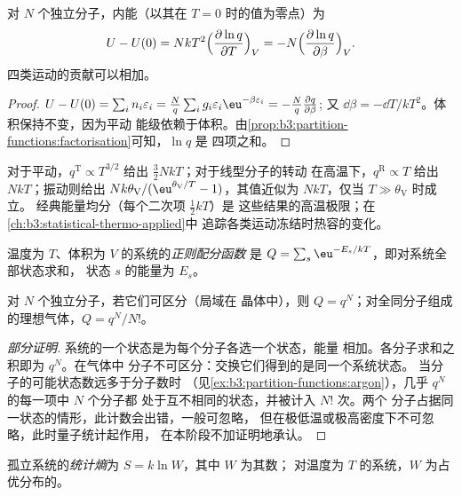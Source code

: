 \begin{theorem}[内能]\label{thm:b3:partition-functions:internal-energy}
对 $N$ 个独立分子，内能（以其在
$T = 0$ 时的值为零点）为
\[
  U - U(0) = NkT^2\Bigl(\frac{\partial\ln q}{\partial T}\Bigr)_V
          = -N\Bigl(\frac{\partial\ln q}{\partial\beta}\Bigr)_V .
\]
四类运动的贡献可以相加。
\end{theorem}

\begin{proof}
$U - U(0) = \sum_in_i\varepsilon_i = \frac Nq\sum_ig_i\varepsilon_i\eu^{-\beta\varepsilon_i} = -\frac Nq\frac{\partial q}{\partial\beta}$;
又 $\dd\beta = -\dd T/kT^2$。体积保持不变，因为平动
能级依赖于体积。由\cref{prop:b3:partition-functions:factorisation}可知，$\ln q$ 是
四项之和。
\end{proof}

对于平动，$q^{\mathrm T} \propto T^{3/2}$ 给出 $\frac32NkT$；对于线型分子的转动
在高温下，$q^{\mathrm R} \propto T$ 给出 $NkT$；振动则给出
$Nk\theta_{\mathrm V}/(\eu^{\theta_{\mathrm V}/T} - 1)$，其值近似为 $NkT$，仅当 $T \gg \theta_{\mathrm V}$ 时成立。
经典能量均分（每个二次项 $\frac12kT$）是
这些结果的高温极限；在\cref{ch:b3:statistical-thermo-applied}中
追踪各类运动冻结时热容的变化。

\begin{definition}[正则配分函数]\label{def:b3:partition-functions:canonical}
温度为 $T$、体积为 $V$ 的系统的\emph{正则配分函数}
是 $Q = \sum_s\eu^{-E_s/kT}$，即对系统全部状态求和，
状态 $s$ 的能量为 $E_s$。
\end{definition}

\begin{proposition}[理想气体的正则配分函数]\label{prop:b3:partition-functions:canonical}
对 $N$ 个独立分子，若它们可区分（局域在
晶体中），则 $Q = q^N$；对全同分子组成的理想气体，$Q = q^N/N!$。
\end{proposition}

\begin{proof}[部分证明]
系统的一个状态是为每个分子各选一个状态，能量
相加。各分子求和之积即为 $q^N$。在气体中
分子不可区分：交换它们得到的是同一个系统状态。
当分子的可能状态数远多于分子数时
（见\cref{ex:b3:partition-functions:argon}），几乎 $q^N$ 的每一项中 $N$ 个分子都
处于互不相同的状态，并被计入 $N!$ 次。两个
分子占据同一状态的情形，此计数会出错，一般可忽略，
但在极低温或极高密度下不可忽略，此时量子统计起作用，
在本阶段不加证明地承认。
\end{proof}

\begin{definition}[统计熵]\label{def:b3:partition-functions:statistical-entropy}
孤立系统的\emph{统计熵}为
$S = k\ln W$，其中 $W$ 为其数；
对温度为 $T$ 的系统，$W$ 为占优分布的。
\end{definition}

